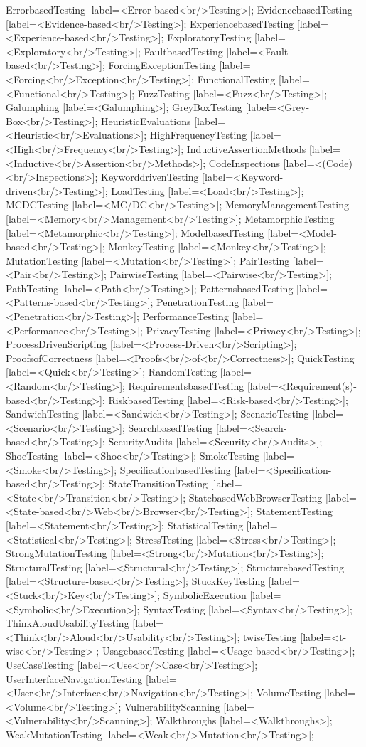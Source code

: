 \documentclass{article}
\begin{document}
{ErrorbasedTesting [label=<Error-based<br/>Testing>];
EvidencebasedTesting [label=<Evidence-based<br/>Testing>];
ExperiencebasedTesting [label=<Experience-based<br/>Testing>];
ExploratoryTesting [label=<Exploratory<br/>Testing>];
FaultbasedTesting [label=<Fault-based<br/>Testing>];
ForcingExceptionTesting [label=<Forcing<br/>Exception<br/>Testing>];
FunctionalTesting [label=<Functional<br/>Testing>];
FuzzTesting [label=<Fuzz<br/>Testing>];
Galumphing [label=<Galumphing>];
GreyBoxTesting [label=<Grey-Box<br/>Testing>];
HeuristicEvaluations [label=<Heuristic<br/>Evaluations>];
HighFrequencyTesting [label=<High<br/>Frequency<br/>Testing>];
InductiveAssertionMethods [label=<Inductive<br/>Assertion<br/>Methods>];
CodeInspections [label=<(Code)<br/>Inspections>];
KeyworddrivenTesting [label=<Keyword-driven<br/>Testing>];
LoadTesting [label=<Load<br/>Testing>];
MCDCTesting [label=<MC/DC<br/>Testing>];
MemoryManagementTesting [label=<Memory<br/>Management<br/>Testing>];
MetamorphicTesting [label=<Metamorphic<br/>Testing>];
ModelbasedTesting [label=<Model-based<br/>Testing>];
MonkeyTesting [label=<Monkey<br/>Testing>];
MutationTesting [label=<Mutation<br/>Testing>];
PairTesting [label=<Pair<br/>Testing>];
PairwiseTesting [label=<Pairwise<br/>Testing>];
PathTesting [label=<Path<br/>Testing>];
PatternsbasedTesting [label=<Patterns-based<br/>Testing>];
PenetrationTesting [label=<Penetration<br/>Testing>];
PerformanceTesting [label=<Performance<br/>Testing>];
PrivacyTesting [label=<Privacy<br/>Testing>];
ProcessDrivenScripting [label=<Process-Driven<br/>Scripting>];
ProofsofCorrectness [label=<Proofs<br/>of<br/>Correctness>];
QuickTesting [label=<Quick<br/>Testing>];
RandomTesting [label=<Random<br/>Testing>];
RequirementsbasedTesting [label=<Requirement(s)-based<br/>Testing>];
RiskbasedTesting [label=<Risk-based<br/>Testing>];
SandwichTesting [label=<Sandwich<br/>Testing>];
ScenarioTesting [label=<Scenario<br/>Testing>];
SearchbasedTesting [label=<Search-based<br/>Testing>];
SecurityAudits [label=<Security<br/>Audits>];
ShoeTesting [label=<Shoe<br/>Testing>];
SmokeTesting [label=<Smoke<br/>Testing>];
SpecificationbasedTesting [label=<Specification-based<br/>Testing>];
StateTransitionTesting [label=<State<br/>Transition<br/>Testing>];
StatebasedWebBrowserTesting [label=<State-based<br/>Web<br/>Browser<br/>Testing>];
StatementTesting [label=<Statement<br/>Testing>];
StatisticalTesting [label=<Statistical<br/>Testing>];
StressTesting [label=<Stress<br/>Testing>];
StrongMutationTesting [label=<Strong<br/>Mutation<br/>Testing>];
StructuralTesting [label=<Structural<br/>Testing>];
StructurebasedTesting [label=<Structure-based<br/>Testing>];
StuckKeyTesting [label=<Stuck<br/>Key<br/>Testing>];
SymbolicExecution [label=<Symbolic<br/>Execution>];
SyntaxTesting [label=<Syntax<br/>Testing>];
ThinkAloudUsabilityTesting [label=<Think<br/>Aloud<br/>Usability<br/>Testing>];
twiseTesting [label=<t-wise<br/>Testing>];
UsagebasedTesting [label=<Usage-based<br/>Testing>];
UseCaseTesting [label=<Use<br/>Case<br/>Testing>];
UserInterfaceNavigationTesting [label=<User<br/>Interface<br/>Navigation<br/>Testing>];
VolumeTesting [label=<Volume<br/>Testing>];
VulnerabilityScanning [label=<Vulnerability<br/>Scanning>];
Walkthroughs [label=<Walkthroughs>];
WeakMutationTesting [label=<Weak<br/>Mutation<br/>Testing>];

}
\end{document}
